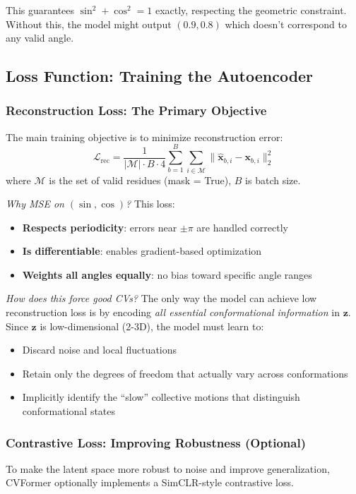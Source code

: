 \documentclass[12pt,a4paper]{article}
\begin{document}
This guarantees $\sin^2 + \cos^2 = 1$ exactly, respecting the geometric constraint. Without this, the model might output $(0.9, 0.8)$ which doesn't correspond to any valid angle.

\subsection{Loss Function: Training the Autoencoder}

\subsubsection{Reconstruction Loss: The Primary Objective}
The main training objective is to minimize reconstruction error:
\begin{equation}
\mathcal{L}_{\text{rec}} = \frac{1}{|\mathcal{M}| \cdot B \cdot 4} \sum_{b=1}^{B} \sum_{i \in \mathcal{M}} \|\hat{\mathbf{x}}_{b,i} - \mathbf{x}_{b,i}\|_2^2
\end{equation}
where $\mathcal{M}$ is the set of valid residues (mask = True), $B$ is batch size.

\textit{Why MSE on $(\sin, \cos)$?} This loss:
\begin{itemize}
    \item \textbf{Respects periodicity}: errors near $\pm \pi$ are handled correctly
    \item \textbf{Is differentiable}: enables gradient-based optimization
    \item \textbf{Weights all angles equally}: no bias toward specific angle ranges
\end{itemize}

\textit{How does this force good CVs?} The only way the model can achieve low reconstruction loss is by encoding \textit{all essential conformational information} in $\mathbf{z}$. Since $\mathbf{z}$ is low-dimensional (2-3D), the model must learn to:
\begin{itemize}
    \item Discard noise and local fluctuations
    \item Retain only the degrees of freedom that actually vary across conformations
    \item Implicitly identify the ``slow'' collective motions that distinguish conformational states
\end{itemize}

\subsubsection{Contrastive Loss: Improving Robustness (Optional)}
To make the latent space more robust to noise and improve generalization, CVFormer optionally implements a SimCLR-style contrastive loss.
\end{document}
